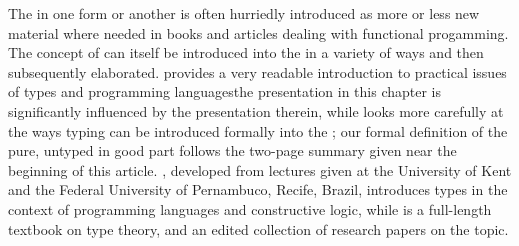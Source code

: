 The \lambdacalc in one form or another is often hurriedly introduced as more or less new material where needed in books and articles dealing with functional progamming. The concept of  can itself be introduced into the \lambdacalc in a variety of ways and then subsequently elaborated. \citet{Cardelli:On-understanding:1985} provides a very readable introduction to practical issues of types and programming languages\empause the presentation in this chapter is significantly influenced by the presentation therein\empause, while \citet{Barendregt:Types:1990} looks more carefully at the ways typing can be introduced formally into the \lambdacalc{}; our formal definition of the pure, untyped \lambdacalc in good part follows the two-page summary given near the beginning of this article. \citet{Thompson:Type:1991}, developed from lectures given at the University of Kent and the Federal University of Pernambuco, Recife, Brazil, introduces types in the context of programming languages and constructive logic, while \citet{Pierce:Types:2002} is a full-length textbook on type theory, and \citet{Pierce:Advanced:2005} an edited collection of research papers on the topic.
